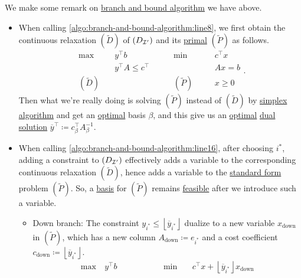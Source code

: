 \begin{remark}
	We make some remark on \hyperref[algo:branch-and-bound-algorithm]{branch and bound algorithm} we have above.
	\begin{itemize}
		\item When calling \autoref{algo:branch-and-bound-algorithm:line8}, we first obtain the continuous relaxation \((\widetilde{D})\) of
		      \((D_{\mathcal{\MakeUppercase{i}} ^\prime })\) and its \hyperref[def:primal]{primal} \((\widetilde{P} )\) as follows.
		      \[
			      \begin{alignedat}{5}
				      \max ~&y^{\top}b\qquad\qquad	&&\min~		&&c^{\top}x\\
				      &y^{\top}A\leq c^{\top} 		&&			&&Ax = b\\
				      (\widetilde{D})\quad	& 				&&(\widetilde{P})\quad	&&x\geq  0
			      \end{alignedat}.
		      \]
		      Then what we're really doing is solving \((\widetilde{P})\) instead of \((\widetilde{D} )\) by \hyperref[algo:simplex-algorithm]{simplex algorithm}
		      and get an \hyperref[def:optimal-solution]{optimal} basis \(\beta\), and this give us an \hyperref[def:optimal-solution]{optimal}
		      \hyperref[def:dual-basic-solution]{dual solution} \(\overline{y}^{\top}\coloneqq c^{\top}_{\beta}A^{-1} _{\beta}\).
		\item When calling \autoref{algo:branch-and-bound-algorithm:line16}, after choosing \(i^{\ast} \), adding a constraint to \((D_{\mathcal{\MakeUppercase{i}} ^\prime })\)
		      effectively adds a variable to the corresponding continuous relaxation \((\widetilde{D})\), hence adds a variable to the \hyperref[def:standard-form]{standard form}
		      problem \((\widetilde{P} )\). So, a \hyperref[def:basic]{basis} for \((\widetilde{P})\) remains \hyperref[def:feasible-solution]{feasible} after we introduce
		      such a variable.
		      \begin{itemize}
			      \item\label{rmk:down-branch} Down branch: The constraint \(y_{i^{\ast}} \leq \left\lfloor \overline{y}_{i^{\ast}} \right\rfloor\) dualize to a new variable
			      \(x_{\text{down}}\) in \((\widetilde{P})\), which has a new column \(A_{\text{down}}\coloneqq e_{i^{\ast}}\) and a cost coefficient
			      \(c_{\text{down}}\coloneqq \left\lfloor \overline{y} _{i^{\ast}}\right\rfloor \).
			      \[
				      \begin{alignedat}{5}
					      \max ~	&y^{\top}b\qquad\qquad				&&\min~	&&c^{\top}x+\left\lfloor \overline{y}_{i^{\ast}} \right\rfloor x_{\text{down}}\\

\end{alignedat}\]
\end{itemize}
\end{itemize}
\end{remark}
